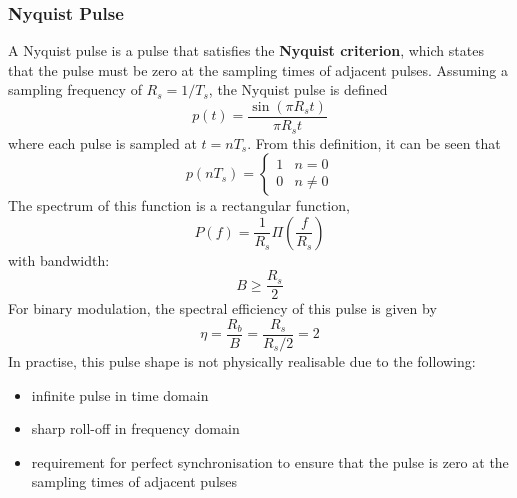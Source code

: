 \documentclass{article}
\begin{document}
\subsubsection{Nyquist Pulse}
A Nyquist pulse is a pulse that satisfies the \textbf{Nyquist
criterion}, which states that the pulse must be zero at the sampling
times of adjacent pulses. Assuming a sampling frequency of \(R_s =
1/T_s\), the Nyquist pulse is defined
\begin{equation*}
    p\left( t \right) = \frac{\sin{\left( \pi R_s t \right)}}{\pi R_s t}
\end{equation*}
where each pulse is sampled at \(t = n T_s\). From this definition, it
can be seen that
\begin{equation*}
    p\left( n T_s \right) =
    \begin{cases}
        1 & n = 0    \\
        0 & n \neq 0
    \end{cases}
\end{equation*}
The spectrum of this function is a rectangular function,
\begin{equation*}
    P\left( f \right) = \frac{1}{R_s} \Pi\left( \frac{f}{R_s} \right)
\end{equation*}
with bandwidth:
\begin{equation*}
    B \geqslant \frac{R_s}{2}
\end{equation*}
For binary modulation, the spectral efficiency of this pulse is given by
\begin{equation*}
    \eta = \frac{R_b}{B} = \frac{R_s}{R_s/2} = 2
\end{equation*}
In practise, this pulse shape is not physically realisable due to the
following:
\begin{itemize}
    \item infinite pulse in time domain
    \item sharp roll-off in frequency domain
    \item requirement for perfect synchronisation to ensure that the
          pulse is zero at the sampling times of adjacent pulses
\end{itemize}
\end{document}
